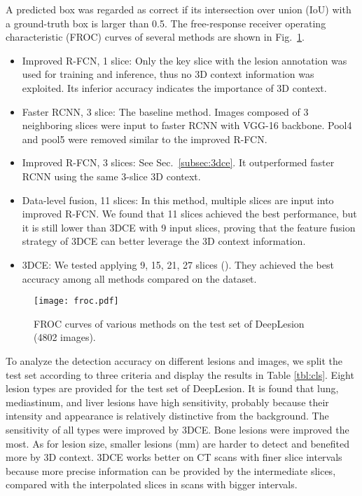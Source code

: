 \documentclass[a4paper]{llncs}
\def\Fig#1{{Fig.\ \ref{fig:#1}}}
\def\Tbl#1{{Table \ref{tbl:#1}}}
\begin{document}
A predicted box was regarded as correct if its intersection over union (IoU) with a ground-truth box is larger than 0.5. The free-response receiver operating characteristic (FROC) curves of several methods are shown in \Fig{froc}.
\begin{itemize}
	\item[] Improved R-FCN, 1 slice: Only the key slice with the lesion annotation was used for training and inference, thus no 3D context information was exploited. Its inferior accuracy indicates the importance of 3D context.
	\item[] Faster RCNN, 3 slice: The baseline method. Images composed of 3 neighboring slices were input to faster RCNN \cite{Ren2015Faster} with VGG-16 backbone. Pool4 and pool5 were removed similar to the improved R-FCN.
	\item[] Improved R-FCN, 3 slices: See Sec.\ \ref{subsec:3dce}. It outperformed faster RCNN using the same 3-slice 3D context.
	\item[] Data-level fusion, 11 slices: In this method, multiple slices are input into improved R-FCN. We found that 11 slices achieved the best performance, but it is still lower than 3DCE with 9 input slices, proving that the feature fusion strategy of 3DCE can better leverage the 3D context information.
	\item[] 3DCE: We tested applying 9, 15, 21, 27 slices (). They achieved the best accuracy among all methods compared on the dataset.
\end{itemize}

\begin{figure}[]
\begin{center}
\texttt{[image: froc.pdf]} \end{center}\caption{FROC curves of various methods on the test set of DeepLesion (4802 images).}\label{fig:froc}\end{figure}

To analyze the detection accuracy on different lesions and images, we split the test set according to three criteria and display the results in \Tbl{cls}. Eight lesion types are provided for the test set of DeepLesion. It is found that lung, mediastinum, and liver lesions have high sensitivity, probably because their intensity and appearance is relatively distinctive from the background. The sensitivity of all types were improved by 3DCE. Bone lesions were improved the most. 
As for lesion size, smaller lesions (mm) are harder to detect and benefited more by 3D context. 3DCE works better on CT scans with finer slice intervals because more precise information can be provided by the intermediate slices, compared with the interpolated slices in scans with bigger intervals.
\end{document}
